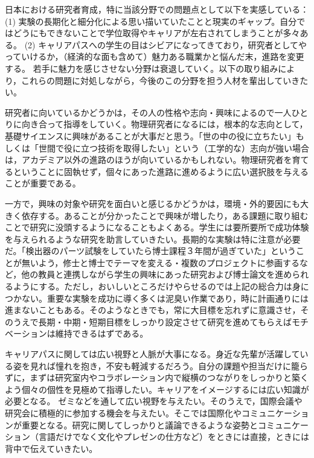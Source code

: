 日本における研究者育成，特に当該分野での問題点として以下を実感している：
(1)	実験の長期化と細分化による思い描いていたことと現実のギャップ。自分ではどうにもできないことで学位取得やキャリアが左右されてしまうことが多々ある。
(2)	キャリアパスへの学生の目はシビアになってきており，研究者としてやっていけるか，（経済的な面も含めて）魅力ある職業かと悩んだ末，進路を変更する。
若手に魅力を感じさせない分野は衰退していく。以下の取り組みにより，これらの問題に対処しながら，今後のこの分野を担う人材を輩出していきたい。

研究者に向いているかどうかは，その人の性格や志向・興味によるので一人ひとりに向き合って指導をしていく。物理研究者になるには，根本的な志向として，基礎サイエンスに興味があることが大事だと思う。「世の中の役に立ちたい」もしくは「世間で役に立つ技術を取得したい」という（工学的な）志向が強い場合は，アカデミア以外の進路のほうが向いているかもしれない。物理研究者を育てるということに固執せず，個々にあった進路に進めるように広い選択肢を与えることが重要である。

一方で，興味の対象や研究を面白いと感じるかどうかは，環境・外的要因にも大きく依存する。あることが分かったことで興味が増したり，ある課題に取り組むことで研究に没頭するようになることもよくある。学生には要所要所で成功体験を与えられるような研究を助言していきたい。長期的な実験は特に注意が必要だ。「検出器のパーツ試験をしていたら博士課程３年間が過ぎていた」ということが無いよう，修士と博士でテーマを変える・複数のプロジェクトに参画するなど，他の教員と連携しながら学生の興味にあった研究および博士論文を進められるようにする。ただし，おいしいところだけやらせるのでは上記の総合力は身につかない。重要な実験を成功に導く多くは泥臭い作業であり，時に計画通りには進まないこともある。そのようなときでも，常に大目標を忘れずに意識させ，そのうえで長期・中期・短期目標をしっかり設定させて研究を進めてもらえばモチベーションは維持できるはずである。

キャリアパスに関しては広い視野と人脈が大事になる。身近な先輩が活躍している姿を見れば憧れを抱き，不安も軽減するだろう。自分の課題や担当だけに籠らずに，まずは研究室内やコラボレーション内で縦横のつながりをしっかりと築くよう個々の個性を見極めて指導したい。キャリアをイメージするには広い知識が必要となる。%
ゼミなどを通して広い視野を与えたい。そのうえで，国際会議や研究会に積極的に参加する機会を与えたい。そこでは国際化やコミュニケーションが重要となる。研究に関してしっかりと議論できるような姿勢とコミュニケーション（言語だけでなく文化やプレゼンの仕方など）をときには直接，ときには背中で伝えていきたい。
\newpage